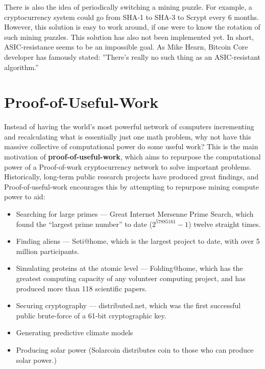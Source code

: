 \documentclass[full.tex]{subfiles}
\begin{document}
    There is also the idea of periodically switching a mining puzzle. For example, a cryptocurrency system could go from SHA-1 to SHA-3 to Scrypt every 6 months. However, this solution is easy to work around, if one were to know the rotation of such mining puzzles. This solution has also not been implemented yet. In short, ASIC-resistance seems to be an impossible goal. As Mike Hearn, Bitcoin Core developer has famously stated: ''There's really no such thing as an ASIC-resistant algorithm.''
    
    \section*{Proof-of-Useful-Work}
    
    Instead of having the world's most powerful network of computers incrementing and recalculating what is essentially just one math problem, why not have this massive collective of computational power do some useful work? This is the main motivation of \textbf{proof-of-useful-work}, which aims to repurpose the computational power of a Proof-of-work cryptocurrency network to solve important problems. Historically, long-term public research projects have produced great findings, and Proof-of-useful-work encourages this by attempting to repurpose mining compute power to aid:
    
    \begin{itemize}
        \item Searching for large primes --- Great Internet Mersenne Prime Search, which found the ``largest prime number'' to date ($2^{57885161} - 1$) twelve straight times.
        \item Finding aliens --- Seti@home, which is the largest project to date, with over 5 million participants.
        \item Simulating proteins at the atomic level --- Folding@home, which has the greatest computing capacity of any volunteer computing project, and has produced more than 118 scientific papers. 
        \item Securing cryptography --- distributed.net, which was the first successful public brute-force of a 61-bit cryptographic key.
        \item Generating predictive climate models 
        \item Producing solar power (Solarcoin distributes coin to those who can produce solar power.)
    \end{itemize}
    
\end{document}
